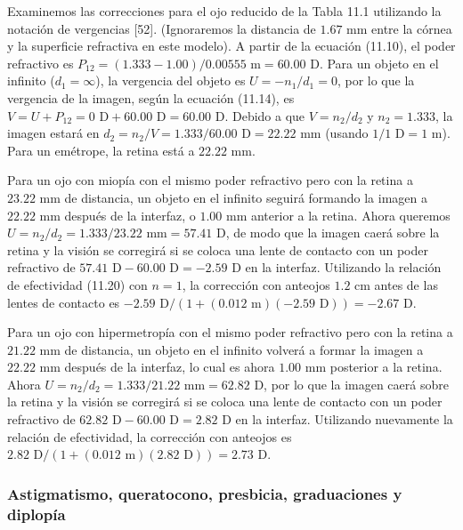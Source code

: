\documentclass[12pt]{book}
\begin{document}
Examinemos las correcciones para el ojo reducido de la Tabla 11.1 utilizando la notación de vergencias [52]. (Ignoraremos la distancia de $1.67\text{ mm}$ entre la córnea y la superficie refractiva en este modelo). A partir de la ecuación (11.10), el poder refractivo es $P_{12} = (1.333 - 1.00)/0.00555\text{ m} = 60.00\text{ D}$. Para un objeto en el infinito ($d_1 = \infty$), la vergencia del objeto es $U = -n_1/d_1 = 0$, por lo que la vergencia de la imagen, según la ecuación (11.14), es $V = U + P_{12} = 0\text{ D} + 60.00\text{ D} = 60.00\text{ D}$. Debido a que $V = n_2/d_2$ y $n_2 = 1.333$, la imagen estará en $d_2 = n_2/V = 1.333/60.00\text{ D} = 22.22\text{ mm}$ (usando $1/1\text{ D} = 1\text{ m}$). Para un emétrope, la retina está a $22.22\text{ mm}$.

Para un ojo con miopía con el mismo poder refractivo pero con la retina a $23.22\text{ mm}$ de distancia, un objeto en el infinito seguirá formando la imagen a $22.22\text{ mm}$ después de la interfaz, o $1.00\text{ mm}$ anterior a la retina. Ahora queremos $U = n_2/d_2 = 1.333/23.22\text{ mm} = 57.41\text{ D}$, de modo que la imagen caerá sobre la retina y la visión se corregirá si se coloca una lente de contacto con un poder refractivo de $57.41\text{ D} - 60.00\text{ D} = -2.59\text{ D}$ en la interfaz. Utilizando la relación de efectividad (11.20) con $n = 1$, la corrección con anteojos $1.2\text{ cm}$ antes de las lentes de contacto es $-2.59\text{ D}/(1+(0.012\text{ m})(-2.59\text{ D})) = -2.67\text{ D}$.

Para un ojo con hipermetropía con el mismo poder refractivo pero con la retina a $21.22\text{ mm}$ de distancia, un objeto en el infinito volverá a formar la imagen a $22.22\text{ mm}$ después de la interfaz, lo cual es ahora $1.00\text{ mm}$ posterior a la retina. Ahora $U = n_2/d_2 = 1.333/21.22\text{ mm} = 62.82\text{ D}$, por lo que la imagen caerá sobre la retina y la visión se corregirá si se coloca una lente de contacto con un poder refractivo de $62.82\text{ D} - 60.00\text{ D} = 2.82\text{ D}$ en la interfaz. Utilizando nuevamente la relación de efectividad, la corrección con anteojos es $2.82\text{ D}/(1+(0.012\text{ m})(2.82\text{ D})) = 2.73\text{ D}$.

\subsubsection*{Astigmatismo, queratocono, presbicia, graduaciones y diplopía}
\end{document}
